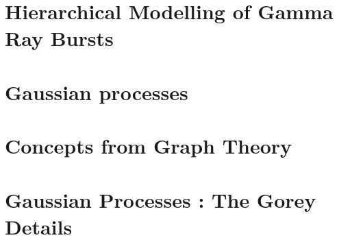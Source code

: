 \documentclass{kentigern}
\theoremstyle{definition}
\begin{document}
\chapter{Hierarchical Modelling of Gamma Ray Bursts}
\label{cha:gamma-ray-burst}



\chapter{Gaussian processes}
\label{cha:gaussian-process}




\appendices

\chapter{Concepts from Graph Theory}
\label{chap:graph-theory}

\chapter{Gaussian Processes : The Gorey Details}
\label{chap:gp-details}






\glsaddall
\printglossaries
\end{document}
